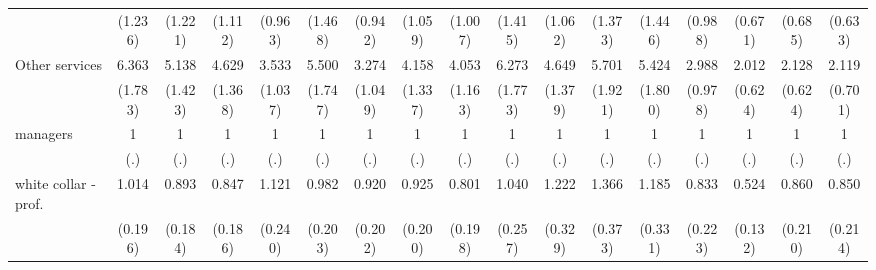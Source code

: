 {\begin{tabular}{l*{16}{c}}
                    &     (1.236)         &     (1.221)         &     (1.112)         &     (0.963)         &     (1.468)         &     (0.942)         &     (1.059)         &     (1.007)         &     (1.415)         &     (1.062)         &     (1.373)         &     (1.446)         &     (0.988)         &     (0.671)         &     (0.685)         &     (0.633)         \\
[1em]
Other services      &       6.363\sym{***}&       5.138\sym{***}&       4.629\sym{***}&       3.533\sym{***}&       5.500\sym{***}&       3.274\sym{***}&       4.158\sym{***}&       4.053\sym{***}&       6.273\sym{***}&       4.649\sym{***}&       5.701\sym{***}&       5.424\sym{***}&       2.988\sym{***}&       2.012\sym{*}  &       2.128\sym{**} &       2.119\sym{*}  \\
                    &     (1.783)         &     (1.423)         &     (1.368)         &     (1.037)         &     (1.747)         &     (1.049)         &     (1.337)         &     (1.163)         &     (1.773)         &     (1.379)         &     (1.921)         &     (1.800)         &     (0.978)         &     (0.624)         &     (0.624)         &     (0.701)         \\
[1em]
managers            &           1         &           1         &           1         &           1         &           1         &           1         &           1         &           1         &           1         &           1         &           1         &           1         &           1         &           1         &           1         &           1         \\
                    &         (.)         &         (.)         &         (.)         &         (.)         &         (.)         &         (.)         &         (.)         &         (.)         &         (.)         &         (.)         &         (.)         &         (.)         &         (.)         &         (.)         &         (.)         &         (.)         \\
[1em]
white collar - prof.&       1.014         &       0.893         &       0.847         &       1.121         &       0.982         &       0.920         &       0.925         &       0.801         &       1.040         &       1.222         &       1.366         &       1.185         &       0.833         &       0.524\sym{*}  &       0.860         &       0.850         \\
                    &     (0.196)         &     (0.184)         &     (0.186)         &     (0.240)         &     (0.203)         &     (0.202)         &     (0.200)         &     (0.198)         &     (0.257)         &     (0.329)         &     (0.373)         &     (0.331)         &     (0.223)         &     (0.132)         &     (0.210)         &     (0.214)         \\

\end{tabular}}
